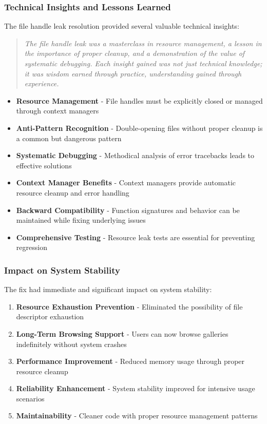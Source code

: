 \documentclass[11pt]{article}
\begin{document}
\subsubsection{Technical Insights and Lessons Learned}

The file handle leak resolution provided several valuable technical insights:

\begin{quote}
\emph{The file handle leak was a masterclass in resource management, a lesson in the importance of proper cleanup, and a demonstration of the value of systematic debugging. Each insight gained was not just technical knowledge; it was wisdom earned through practice, understanding gained through experience.}
\end{quote}

\begin{itemize}
\item \textbf{Resource Management} - File handles must be explicitly closed or managed through context managers
\item \textbf{Anti-Pattern Recognition} - Double-opening files without proper cleanup is a common but dangerous pattern
\item \textbf{Systematic Debugging} - Methodical analysis of error tracebacks leads to effective solutions
\item \textbf{Context Manager Benefits} - Context managers provide automatic resource cleanup and error handling
\item \textbf{Backward Compatibility} - Function signatures and behavior can be maintained while fixing underlying issues
\item \textbf{Comprehensive Testing} - Resource leak tests are essential for preventing regression
\end{itemize}

\subsubsection{Impact on System Stability}

The fix had immediate and significant impact on system stability:

\begin{enumerate}
\item \textbf{Resource Exhaustion Prevention} - Eliminated the possibility of file descriptor exhaustion
\item \textbf{Long-Term Browsing Support} - Users can now browse galleries indefinitely without system crashes
\item \textbf{Performance Improvement} - Reduced memory usage through proper resource cleanup
\item \textbf{Reliability Enhancement} - System stability improved for intensive usage scenarios
\item \textbf{Maintainability} - Cleaner code with proper resource management patterns
\end{enumerate}
\end{document}
